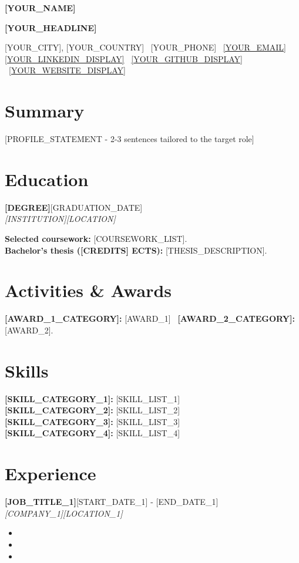 \documentclass[10pt,a4paper]{article}
\newcommand{\entry}[4]{
  \textbf{#1}\hfill{\small #2}\\[-1pt]
  \textit{#3}\hfill{\small\textit{#4}}\par\vspace{-1.5pt}
}
\begin{document}
{\fontsize{26.5pt}{28pt}\selectfont\bfseries\color{ink} [YOUR_NAME]}\par
\vspace{1pt}
{\fontsize{12.5pt}{14pt}\selectfont\bfseries\color{accent} [YOUR_HEADLINE]}\par
\vspace{3pt}
{\small
[YOUR_CITY], [YOUR_COUNTRY] \textbar\ [YOUR_PHONE] \textbar\
\href{mailto:[YOUR_EMAIL]}{[YOUR_EMAIL]}\\[-1pt]
\href{[YOUR_LINKEDIN_URL]}{[YOUR_LINKEDIN_DISPLAY]} \textbar\
\href{[YOUR_GITHUB_URL]}{[YOUR_GITHUB_DISPLAY]} \textbar\
\href{[YOUR_WEBSITE_URL]}{[YOUR_WEBSITE_DISPLAY]}
}

\section{Summary}
[PROFILE_STATEMENT - 2-3 sentences tailored to the target role]

\section{Education}
\entry{[DEGREE]}{[GRADUATION_DATE]}{[INSTITUTION]}{[LOCATION]}
\textbf{Selected coursework:} [COURSEWORK_LIST].\\[-1pt]
\textbf{Bachelor's thesis ([CREDITS] ECTS):} [THESIS_DESCRIPTION].\\[-1pt]
\section{Activities \& Awards}
\textbf{[AWARD_1_CATEGORY]:} [AWARD_1] \textbar\ \textbf{[AWARD_2_CATEGORY]:} [AWARD_2].

\section{Skills}
\textbf{[SKILL_CATEGORY_1]:} [SKILL_LIST_1]\\
\textbf{[SKILL_CATEGORY_2]:} [SKILL_LIST_2]\\
\textbf{[SKILL_CATEGORY_3]:} [SKILL_LIST_3]\\
\textbf{[SKILL_CATEGORY_4]:} [SKILL_LIST_4]

\section{Experience}
\entry{[JOB_TITLE_1]}{[START_DATE_1] - [END_DATE_1]}{[COMPANY_1]}{[LOCATION_1]}
\begin{itemize}
  \item [BULLET_1]
  \item [BULLET_2]
  \item [BULLET_3]
\end{itemize}
\end{document}
